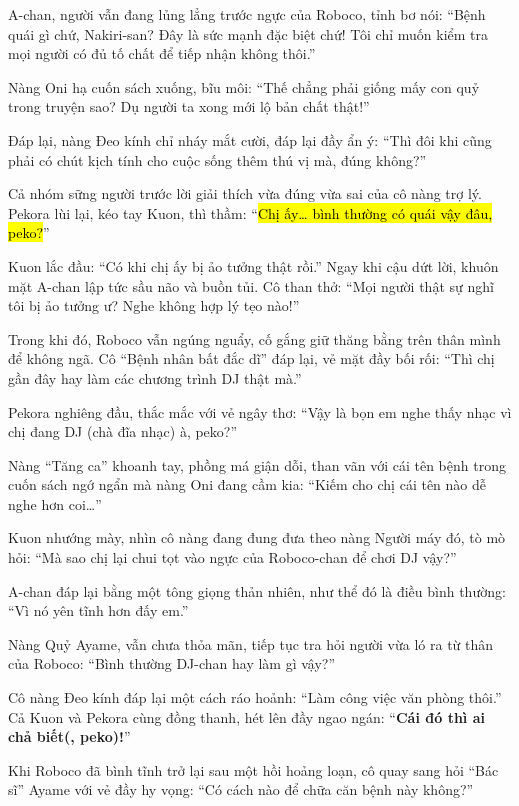 \documentclass[../main.tex]{subfiles}
\begin{document}
A-chan, người vẫn đang lủng lẳng trước ngực của Roboco, tỉnh bơ nói: ``Bệnh quái gì chứ, Nakiri-san? Đây là sức mạnh đặc biệt chứ! Tôi chỉ muốn kiểm tra mọi người có đủ tố chất để tiếp nhận không thôi.''


Nàng Oni hạ cuốn sách xuống, bĩu môi: ``Thế chẳng phải giống mấy con quỷ trong truyện sao? Dụ người ta xong mới lộ bản chất thật!''

Đáp lại, nàng Đeo kính chỉ nháy mắt cười, đáp lại đầy ẩn ý: ``Thì đôi khi cũng phải có chút kịch tính cho cuộc sống thêm thú vị mà, đúng không?''

Cả nhóm sững người trước lời giải thích vừa đúng vừa sai của cô nàng trợ lý. Pekora lùi lại, kéo tay Kuon, thì thầm: ``\hl{Chị ấy\dots{} bình thường có quái vậy đâu, peko?}''

Kuon lắc đầu: ``Có khi chị ấy bị ảo tưởng thật rồi.'' Ngay khi cậu dứt lời, khuôn mặt A-chan lập tức sầu não và buồn tủi. Cô than thở: ``Mọi người thật sự nghĩ tôi bị ảo tưởng ư? Nghe không hợp lý tẹo nào!''

Trong khi đó, Roboco vẫn ngúng nguẩy, cố gắng giữ thăng bằng trên thân mình để không ngã. Cô ``Bệnh nhân bất đắc dĩ'' đáp lại, vẻ mặt đầy bối rối:
``Thì chị gần đây hay làm các chương trình DJ thật mà.''

Pekora nghiêng đầu, thắc mắc với vẻ ngây thơ: ``Vậy là bọn em nghe thấy nhạc vì chị đang DJ (chà đĩa nhạc) à, peko?''

Nàng ``Tăng ca'' khoanh tay, phồng má giận dỗi, than vãn với cái tên bệnh trong cuốn sách ngớ ngẩn mà nàng Oni đang cầm kia: ``Kiếm cho chị cái tên nào dễ nghe hơn coi\dots''

Kuon nhướng mày, nhìn cô nàng đang đung đưa theo nàng Người máy đó, tò mò hỏi: ``Mà sao chị lại chui tọt vào ngực của Roboco-chan để chơi DJ vậy?''

A-chan đáp lại bằng một tông giọng thản nhiên, như thể đó là điều bình thường: ``Vì nó yên tĩnh hơn đấy em.''

Nàng Quỷ Ayame, vẫn chưa thỏa mãn, tiếp tục tra hỏi người vừa ló ra từ thân của Roboco: ``Bình thường DJ-chan hay làm gì vậy?''

Cô nàng Đeo kính đáp lại một cách ráo hoảnh: ``Làm công việc văn phòng thôi.'' Cả Kuon và Pekora cùng đồng thanh, hét lên đầy ngao ngán: ``\textbf{Cái đó thì ai chả biết(, peko)!}''

\ct

Khi Roboco đã bình tĩnh trở lại sau một hồi hoảng loạn, cô quay sang hỏi ``Bác sĩ'' Ayame với vẻ đầy hy vọng: ``Có cách nào để chữa căn bệnh này không?''
\end{document}
